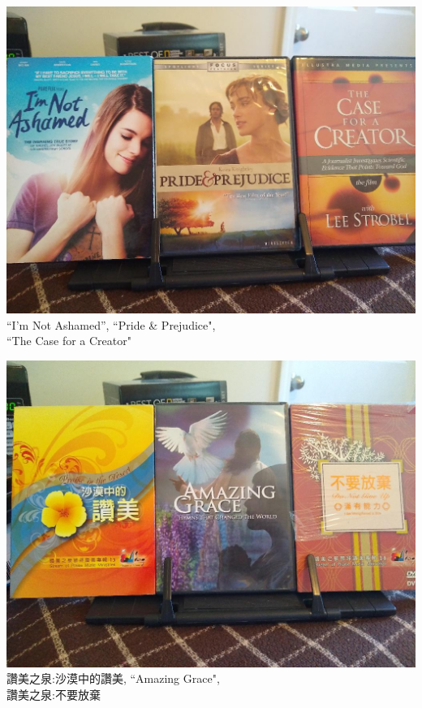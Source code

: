 \documentclass[t]{beamer}
\newcommand{\htarget}[2]{\hypertarget{#1}{#2}}
\begin{document}
\begin{frame}\htarget{case}{} \begin{center}
\includegraphics[height=0.8\textheight]{dvd02_mini.jpg} \\
``I'm Not Ashamed'', ``Pride \& Prejudice", \\
``The Case for a Creator"
\end{center} \end{frame}
\begin{frame}\htarget{praise}{} \begin{center}
\includegraphics[height=0.8\textheight]{dvd03_mini.jpg} \\
讚美之泉:沙漠中的讚美, ``Amazing Grace", \\
讚美之泉:不要放棄
\end{center} \end{frame}
\end{document}
